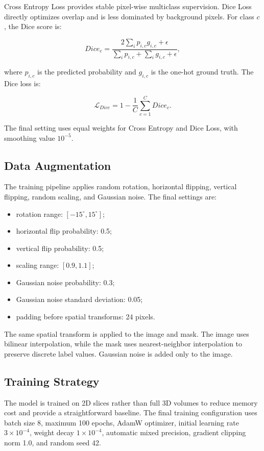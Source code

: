 Cross Entropy Loss provides stable pixel-wise multiclass supervision. Dice Loss directly optimizes overlap and is less dominated by background pixels. For class \(c\), the Dice score is:

\[
Dice_c =
\frac{2\sum_i p_{i,c}g_{i,c}+\epsilon}
{\sum_i p_{i,c}+\sum_i g_{i,c}+\epsilon},
\]

where \(p_{i,c}\) is the predicted probability and \(g_{i,c}\) is the one-hot ground truth. The Dice loss is:

\[
\mathcal{L}_{Dice}=1-\frac{1}{C}\sum_{c=1}^{C}Dice_c.
\]

The final setting uses equal weights for Cross Entropy and Dice Loss, with smoothing value \(10^{-5}\).

\subsection{Data Augmentation}

The training pipeline applies random rotation, horizontal flipping, vertical flipping, random scaling, and Gaussian noise. The final settings are:

\begin{itemize}
    \item rotation range: \([-15^\circ,15^\circ]\);
    \item horizontal flip probability: 0.5;
    \item vertical flip probability: 0.5;
    \item scaling range: \([0.9,1.1]\);
    \item Gaussian noise probability: 0.3;
    \item Gaussian noise standard deviation: 0.05;
    \item padding before spatial transforms: 24 pixels.
\end{itemize}

The same spatial transform is applied to the image and mask. The image uses bilinear interpolation, while the mask uses nearest-neighbor interpolation to preserve discrete label values. Gaussian noise is added only to the image.

\subsection{Training Strategy}

The model is trained on 2D slices rather than full 3D volumes to reduce memory cost and provide a straightforward baseline. The final training configuration uses batch size 8, maximum 100 epochs, AdamW optimizer, initial learning rate \(3 \times 10^{-4}\), weight decay \(1 \times 10^{-4}\), automatic mixed precision, gradient clipping norm 1.0, and random seed 42.

